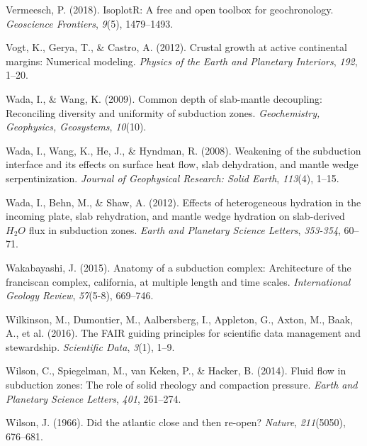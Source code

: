 \begin{CSLReferences}{1}{1}
\leavevmode{}%
Vermeesch, P. (2018). IsoplotR: A free and open toolbox for geochronology. \emph{Geoscience Frontiers}, \emph{9}(5), 1479--1493.

\leavevmode{}%
Vogt, K., Gerya, T., \& Castro, A. (2012). Crustal growth at active continental margins: Numerical modeling. \emph{Physics of the Earth and Planetary Interiors}, \emph{192}, 1--20.

\leavevmode{}%
Wada, I., \& Wang, K. (2009). Common depth of slab-mantle decoupling: Reconciling diversity and uniformity of subduction zones. \emph{Geochemistry, Geophysics, Geosystems}, \emph{10}(10).

\leavevmode{}%
Wada, I., Wang, K., He, J., \& Hyndman, R. (2008). Weakening of the subduction interface and its effects on surface heat flow, slab dehydration, and mantle wedge serpentinization. \emph{Journal of Geophysical Research: Solid Earth}, \emph{113}(4), 1--15.

\leavevmode{}%
Wada, I., Behn, M., \& Shaw, A. (2012). Effects of heterogeneous hydration in the incoming plate, slab rehydration, and mantle wedge hydration on slab-derived \(H_2O\) flux in subduction zones. \emph{Earth and Planetary Science Letters}, \emph{353-354}, 60--71.

\leavevmode{}%
Wakabayashi, J. (2015). Anatomy of a subduction complex: Architecture of the franciscan complex, california, at multiple length and time scales. \emph{International Geology Review}, \emph{57}(5-8), 669--746.

\leavevmode{}%
Wilkinson, M., Dumontier, M., Aalbersberg, I., Appleton, G., Axton, M., Baak, A., et al. (2016). The FAIR guiding principles for scientific data management and stewardship. \emph{Scientific Data}, \emph{3}(1), 1--9.

\leavevmode{}%
Wilson, C., Spiegelman, M., van Keken, P., \& Hacker, B. (2014). Fluid flow in subduction zones: The role of solid rheology and compaction pressure. \emph{Earth and Planetary Science Letters}, \emph{401}, 261--274.

\leavevmode{}%
Wilson, J. (1966). Did the atlantic close and then re-open? \emph{Nature}, \emph{211}(5050), 676--681.


\end{CSLReferences}
